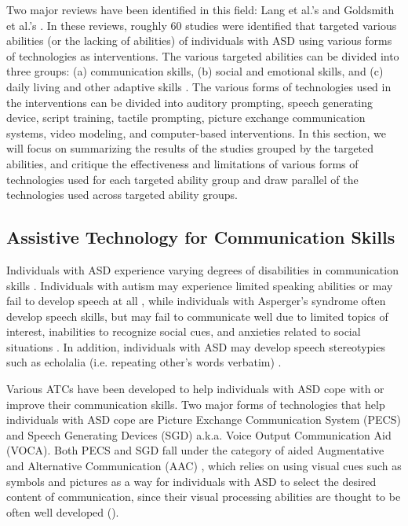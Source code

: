\documentclass{ut-thesis}
\begin{document}
Two major reviews have been identified in this field: Lang et al.'s \cite{lang2014assistive} and Goldsmith et al.'s \cite{goldsmith2004use}.  In these reviews, roughly 60 studies were identified that targeted various abilities (or the lacking of abilities) of individuals with ASD using various forms of technologies as interventions.  The various targeted abilities can be divided into three groups: (a) communication skills, (b) social and emotional skills, and (c) daily living and other adaptive skills \cite{lang2014assistive}.  The various forms of technologies used in the interventions can be divided into auditory prompting, speech generating device, script training, tactile prompting, picture exchange communication systems, video modeling, and computer-based interventions.  In this section, we will focus on summarizing the results of the studies grouped by the targeted abilities, and critique the effectiveness and limitations of various forms of technologies used for each targeted ability group and draw parallel of the technologies used across targeted ability groups.

\subsection{Assistive Technology for Communication Skills}
Individuals with ASD experience varying degrees of disabilities in communication skills \cite{howlin2003outcome}.  Individuals with autism may experience limited speaking abilities or may fail to develop speech at all \cite{weitz1997aac}, while individuals with Asperger's syndrome often develop speech skills, but may fail to communicate well due to limited topics of interest, inabilities to recognize social cues, and anxieties related to social situations \cite{scheuermann2002teaching}.  In addition, individuals with ASD may develop speech stereotypies such as echolalia (i.e. repeating other's words verbatim) \cite{sigafoos2007assessing}.

Various ATCs have been developed to help individuals with ASD cope with or improve their communication skills.  Two major forms of technologies that help individuals with ASD cope are Picture Exchange Communication System (PECS) and Speech Generating Devices (SGD) a.k.a. Voice Output Communication Aid (VOCA).  Both PECS and SGD fall under the category of aided Augmentative and Alternative Communication (AAC) \cite{sigafoos2001conditional}, which relies on using visual cues such as symbols and pictures as a way for individuals with ASD to select the desired content of communication, since their visual processing abilities are thought to be often well developed (\cite{mirenda2001autism, shane2012applying}).
\end{document}
